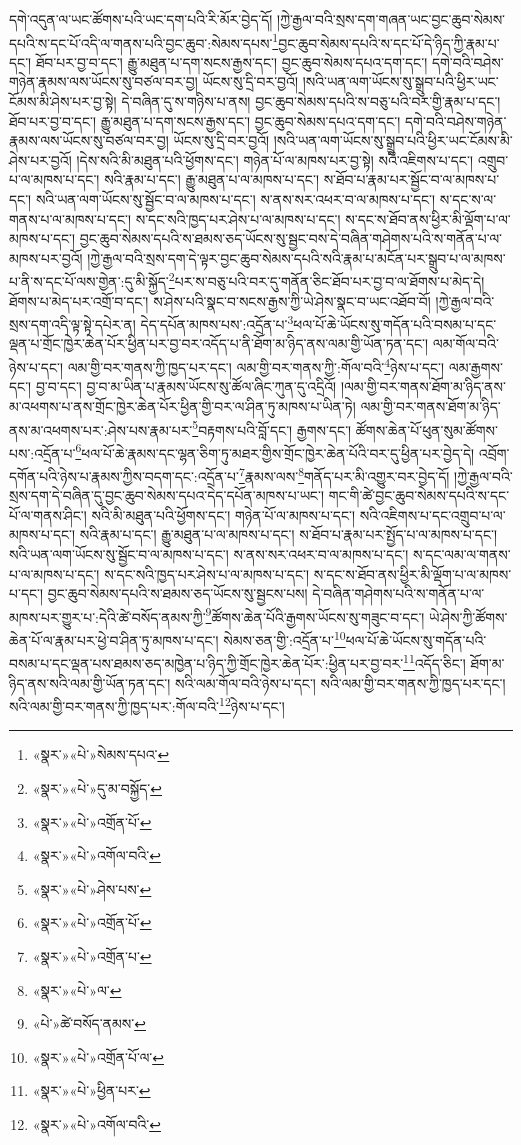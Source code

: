 དགེ་འདུན་ལ་ཡང་ཚོགས་པའི་ཡང་དག་པའི་རི་མོར་བྱེད་དོ། །ཀྱེ་རྒྱལ་བའི་སྲས་དག་གཞན་ཡང་བྱང་ཆུབ་སེམས་དཔའི་ས་དང་པོ་འདི་ལ་གནས་པའི་བྱང་ཆུབ་:སེམས་དཔས་\footnote{«སྣར་»«པེ་»སེམས་དཔའ་}བྱང་ཆུབ་སེམས་དཔའི་ས་དང་པོ་དེ་ཉིད་ཀྱི་རྣམ་པ་དང་། ཐོབ་པར་བྱ་བ་དང་། རྒྱུ་མཐུན་པ་དག་སངས་རྒྱས་དང་། བྱང་ཆུབ་སེམས་དཔའ་དག་དང་། དགེ་བའི་བཤེས་གཉེན་རྣམས་ལས་ཡོངས་སུ་བཙལ་བར་བྱ། ཡོངས་སུ་དྲི་བར་བྱའོ། །སའི་ཡན་ལག་ཡོངས་སུ་སྒྲུབ་པའི་ཕྱིར་ཡང་ངོམས་མི་ཤེས་པར་བྱ་སྟེ། དེ་བཞིན་དུ་ས་གཉིས་པ་ནས། བྱང་ཆུབ་སེམས་དཔའི་ས་བཅུ་པའི་བར་གྱི་རྣམ་པ་དང་། ཐོབ་པར་བྱ་བ་དང་། རྒྱུ་མཐུན་པ་དག་སངས་རྒྱས་དང་། བྱང་ཆུབ་སེམས་དཔའ་དག་དང་། དགེ་བའི་བཤེས་གཉེན་རྣམས་ལས་ཡོངས་སུ་བཙལ་བར་བྱ། ཡོངས་སུ་དྲི་བར་བྱའོ། །སའི་ཡན་ལག་ཡོངས་སུ་སྒྲུབ་པའི་ཕྱིར་ཡང་ངོམས་མི་ཤེས་པར་བྱའོ། །དེས་སའི་མི་མཐུན་པའི་ཕྱོགས་དང་། གཉེན་པོ་ལ་མཁས་པར་བྱ་སྟེ། སའི་འཇིགས་པ་དང་། འགྲུབ་པ་ལ་མཁས་པ་དང་། སའི་རྣམ་པ་དང་། རྒྱུ་མཐུན་པ་ལ་མཁས་པ་དང་། ས་ཐོབ་པ་རྣམ་པར་སྦྱོང་བ་ལ་མཁས་པ་དང་། སའི་ཡན་ལག་ཡོངས་སུ་སྦྱོང་བ་ལ་མཁས་པ་དང་། ས་ནས་སར་འཕར་བ་ལ་མཁས་པ་དང་། ས་དང་ས་ལ་གནས་པ་ལ་མཁས་པ་དང་། ས་དང་སའི་ཁྱད་པར་ཤེས་པ་ལ་མཁས་པ་དང་། ས་དང་ས་ཐོབ་ནས་ཕྱིར་མི་ལྡོག་པ་ལ་མཁས་པ་དང་། བྱང་ཆུབ་སེམས་དཔའི་ས་ཐམས་ཅད་ཡོངས་སུ་སྦྱང་བས་དེ་བཞིན་གཤེགས་པའི་ས་གནོན་པ་ལ་མཁས་པར་བྱའོ། །ཀྱེ་རྒྱལ་བའི་སྲས་དག་དེ་ལྟར་བྱང་ཆུབ་སེམས་དཔའི་སའི་རྣམ་པ་མངོན་པར་སྒྲུབ་པ་ལ་མཁས་པ་ནི་ས་དང་པོ་ལས་གྱེན་:དུ་མི་སྐྱོད་\footnote{«སྣར་»«པེ་»དུ་མ་བསྐྱོད་}པར་ས་བཅུ་པའི་བར་དུ་གནོན་ཅིང་ཐོབ་པར་བྱ་བ་ལ་ཐོགས་པ་མེད་དེ། ཐོགས་པ་མེད་པར་འགྲོ་བ་དང་། ས་ཤེས་པའི་སྣང་བ་སངས་རྒྱས་ཀྱི་ཡེ་ཤེས་སྣང་བ་ཡང་འཐོབ་བོ། །ཀྱེ་རྒྱལ་བའི་སྲས་དག་འདི་ལྟ་སྟེ་དཔེར་ན། དེད་དཔོན་མཁས་པས་:འདྲོན་པ་\footnote{«སྣར་»«པེ་»འགྲོན་པོ་}ཕལ་པོ་ཆེ་ཡོངས་སུ་གདོན་པའི་བསམ་པ་དང་ལྡན་པ་གྲོང་ཁྱེར་ཆེན་པོར་ཕྱིན་པར་བྱ་བར་འདོད་པ་ནི་ཐོག་མ་ཉིད་ནས་ལམ་གྱི་ཡོན་ཏན་དང་། ལམ་གོལ་བའི་ཉེས་པ་དང་། ལམ་གྱི་བར་གནས་ཀྱི་ཁྱད་པར་དང་། ལམ་གྱི་བར་གནས་ཀྱི་:གོལ་བའི་\footnote{«སྣར་»«པེ་»འགོལ་བའི་}ཉེས་པ་དང་། ལམ་རྒྱགས་དང་། བྱ་བ་དང་། བྱ་བ་མ་ཡིན་པ་རྣམས་ཡོངས་སུ་ཚོལ་ཞིང་ཀུན་དུ་འདྲིའོ། །ལམ་གྱི་བར་གནས་ཐོག་མ་ཉིད་ནས་མ་འཕགས་པ་ནས་གྲོང་ཁྱེར་ཆེན་པོར་ཕྱིན་གྱི་བར་ལ་ཤིན་ཏུ་མཁས་པ་ཡིན་ཏེ། ལམ་གྱི་བར་གནས་ཐོག་མ་ཉིད་ནས་མ་འཕགས་པར་:ཤེས་པས་རྣམ་པར་\footnote{«སྣར་»«པེ་»ཤེས་པས་}བརྟགས་པའི་བློ་དང་། རྒྱགས་དང་། ཚོགས་ཆེན་པོ་ཕུན་སུམ་ཚོགས་པས་:འདྲོན་པ་\footnote{«སྣར་»«པེ་»འགྲོན་པོ་}ཕལ་པོ་ཆེ་རྣམས་དང་ལྷན་ཅིག་ཏུ་མཐར་གྱིས་གྲོང་ཁྱེར་ཆེན་པོའི་བར་དུ་ཕྱིན་པར་བྱེད་དེ། འབྲོག་དགོན་པའི་ཉེས་པ་རྣམས་ཀྱིས་བདག་དང་:འདྲོན་པ་\footnote{«སྣར་»«པེ་»འགྲོན་པ་}རྣམས་ལས་\footnote{«སྣར་»«པེ་»ལ་}གནོད་པར་མི་འགྱུར་བར་བྱེད་དོ། །ཀྱེ་རྒྱལ་བའི་སྲས་དག་དེ་བཞིན་དུ་བྱང་ཆུབ་སེམས་དཔའ་དེད་དཔོན་མཁས་པ་ཡང་། གང་གི་ཚེ་བྱང་ཆུབ་སེམས་དཔའི་ས་དང་པོ་ལ་གནས་ཤིང་། སའི་མི་མཐུན་པའི་ཕྱོགས་དང་། གཉེན་པོ་ལ་མཁས་པ་དང་། སའི་འཇིགས་པ་དང་འགྲུབ་པ་ལ་མཁས་པ་དང་། སའི་རྣམ་པ་དང་། རྒྱུ་མཐུན་པ་ལ་མཁས་པ་དང་། ས་ཐོབ་པ་རྣམ་པར་སྤྱོད་པ་ལ་མཁས་པ་དང་། སའི་ཡན་ལག་ཡོངས་སུ་སྦྱོང་བ་ལ་མཁས་པ་དང་། ས་ནས་སར་འཕར་བ་ལ་མཁས་པ་དང་། ས་དང་ལམ་ལ་གནས་པ་ལ་མཁས་པ་དང་། ས་དང་སའི་ཁྱད་པར་ཤེས་པ་ལ་མཁས་པ་དང་། ས་དང་ས་ཐོབ་ནས་ཕྱིར་མི་ལྡོག་པ་ལ་མཁས་པ་དང་། བྱང་ཆུབ་སེམས་དཔའི་ས་ཐམས་ཅད་ཡོངས་སུ་སྦྱངས་པས། དེ་བཞིན་གཤེགས་པའི་ས་གནོན་པ་ལ་མཁས་པར་གྱུར་པ་:དེའི་ཚེ་བསོད་ནམས་ཀྱི་\footnote{«པེ་»ཚེ་བསོད་ནམས་}ཚོགས་ཆེན་པོའི་རྒྱགས་ཡོངས་སུ་གཟུང་བ་དང་། ཡེ་ཤེས་ཀྱི་ཚོགས་ཆེན་པོ་ལ་རྣམ་པར་ཕྱེ་བ་ཤིན་ཏུ་མཁས་པ་དང་། སེམས་ཅན་གྱི་:འདྲོན་པ་\footnote{«སྣར་»«པེ་»འགྲོན་པོ་ལ་}ཕལ་པོ་ཆེ་ཡོངས་སུ་གདོན་པའི་བསམ་པ་དང་ལྡན་པས་ཐམས་ཅད་མཁྱེན་པ་ཉིད་ཀྱི་གྲོང་ཁྱེར་ཆེན་པོར་:ཕྱིན་པར་བྱ་བར་\footnote{«སྣར་»«པེ་»ཕྱིན་པར་}འདོད་ཅིང་། ཐོག་མ་ཉིད་ནས་སའི་ལམ་གྱི་ཡོན་ཏན་དང་། སའི་ལམ་གོལ་བའི་ཉེས་པ་དང་། སའི་ལམ་གྱི་བར་གནས་ཀྱི་ཁྱད་པར་དང་། སའི་ལམ་གྱི་བར་གནས་ཀྱི་ཁྱད་པར་:གོལ་བའི་\footnote{«སྣར་»«པེ་»འགོལ་བའི་}ཉེས་པ་དང་། 